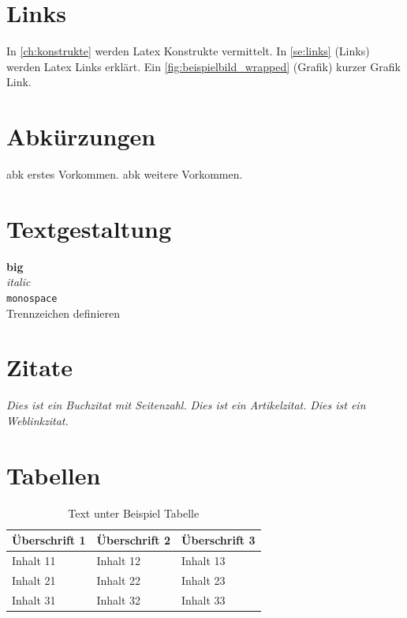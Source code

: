 \documentclass[
							a4paper, 
							11pt, 
							openany, 
							liststotoc,
							parskip=half, 
   							headings=normal
						]{scrreprt}
\begin{document}
\section{Links} \label{se:konstrukte_links}
In \autoref{ch:konstrukte} werden Latex Konstrukte vermittelt.
\newline
In \autoref{se:links} (Links) werden Latex Links erklärt.
\newline
Ein \ref{fig:beispielbild_wrapped} (Grafik) kurzer Grafik Link.
\clearpage


\section{Abkürzungen} \label{se:konstrukte_abkuerzungen}
\acf{abk} erstes Vorkommen.
\newline
\acs{abk} weitere Vorkommen.
\clearpage

\section{Textgestaltung} \label{se:konstrukte_textgestaltung}
\textbf{big}\\
\textit{\glqq italic\grqq}\\
\texttt{monospace}\\
Trenn\-zeichen definieren\\
\clearpage

\section{Zitate} \label{se:konstrukte_zitate}
\textit{\glqq Dies ist ein Buchzitat mit Seitenzahl.\grqq}\cite[S.92ff.]{bsp:buchzitat}
\newline
\textit{\glqq Dies ist ein Artikelzitat.\grqq}\cite{bsp:artikelzitat}
\newline
\textit{\glqq Dies ist ein Weblinkzitat.\grqq}\cite{bsp:weblinkzitat}
\clearpage

\section{Tabellen} \label{se:konstrukte_tabellen}
\begin{table}[h]\footnotesize
\begin{center}
\begin{tabular}{ | p{3cm} | p{5cm} | p{5cm} |}
  \hline
    \textbf{Überschrift 1} & \textbf{Überschrift 2} & \textbf{Überschrift 3} \\
  \hline
    Inhalt 11 & Inhalt 12 & Inhalt 13 \\
  \hline
    Inhalt 21 & Inhalt 22 & Inhalt 23 \\
  \hline
    Inhalt 31 & Inhalt 32 & Inhalt 33 \\
  \hline
\end{tabular}
\caption[Kurzeintrag Verzeichnis Beispiel Tabelle]{Text unter Beispiel Tabelle} \label{tab:Beispieltabelle}
\end{center}
\end{table}
\clearpage
\end{document}
